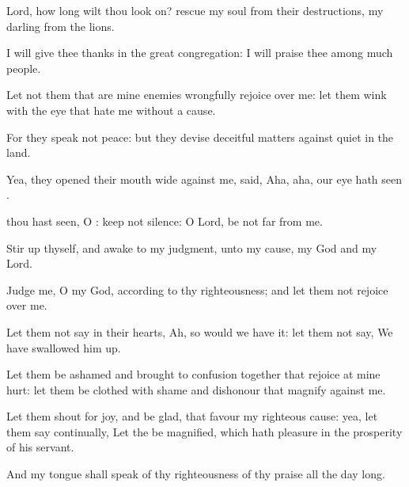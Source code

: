 {\Q {}Lord, how long wilt thou look
on?
rescue my
soul from their
destructions, my
darling from the
lions.


\par }{\Q {}I will give thee
thanks in the
great
congregation: I will
praise thee among
much
people.


\par }{\Q {}Let not them that are mine
enemies
wrongfully
rejoice over me:
{} let them
wink with the
eye that
hate me without a
cause.


\par }{\Q {}For they
speak not
peace: but they
devise
deceitful
matters against
{}
quiet in the
land.


\par }{\Q {}Yea, they opened their
mouth
wide against me,
{}
said,
Aha,
aha, our
eye hath
seen
{}.


\par }{\Q {} thou hast
seen, O
{}: keep not
silence: O
Lord, be not
far from me.


\par }{\Q {}Stir
up thyself, and
awake to my
judgment,
{} unto my
cause, my
God and my
Lord.


\par }{\Q {}Judge me, O
{} my
God, according to thy
righteousness; and let them not
rejoice over me.


\par }{\Q {}Let them not
say in their
hearts,
Ah, so would we have
it: let them not
say, We have swallowed him
up.


\par }{\Q {}Let them be
ashamed and brought to
confusion
together that
rejoice at mine
hurt: let them be
clothed with
shame and
dishonour that
magnify
{} against me.


\par }{\Q {}Let them shout for
joy, and be
glad, that
favour my righteous
cause: yea, let them
say
continually, Let the
{} be
magnified, which hath
pleasure in the
prosperity of his
servant.


\par }{\Q {}And my
tongue shall
speak of thy
righteousness
{} of thy
praise all the
day long.




\par }
